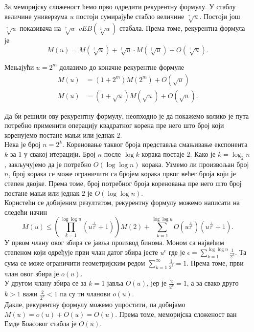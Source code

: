 \documentclass[11pt, a4paper]{article}
\theoremstyle{remark}
\numberwithin{equation}{section}
\begin{document}
	\noindent За меморијску сложеност ћемо прво одредити рекурентну формулу. У стаблу величине универзума $u$ постоји сумирајуће стабло величине $\sqrt[\uparrow]{u}$. Постоји још $\sqrt[\uparrow]{u}$ показивача на $\sqrt[\uparrow]{u}$ $vEB(\sqrt[\downarrow]{u})$ стабала. Према томе, рекурентна формула је
	\begin{equation}
		M(u)=M(\sqrt[\uparrow]{u})+\sqrt[\uparrow]{u}\cdot M(\sqrt[\downarrow]{u})+O(\sqrt[\uparrow]{u}).
	\end{equation}
	
	Мењајући $u=2^m$ долазимо до коначне рекурентне формуле
	\begin{equation}
	\begin{split}
		M(u) &= (1+2^m)M(2^m)+O(\sqrt{u}) \\
		M(u) &= (1+\sqrt{u})M(\sqrt u)+O(\sqrt{u}).
	\end{split}
	\end{equation}
	
	Да би решили ову рекурентну формулу, неопходно је да покажемо колико је пута потребно применити операцију квадратног корена пре него што број који коренујемо постане мањи или једнак $2$. \\
	\indent Нека је број $n=2^k$. Кореновање таквог броја представља смањивање експонента $k$ за $1$ у свакој итерацији. Број $n$ после $\log k$ корака постаје $2$. Како је $k=\log_2 n$, закључујемо да је потребно $O(\log\log n)$ корака. Узмемо ли произвољан број $n$, број корака се може ограничити са бројем корака првог већег броја који је степен двојке. Према томе, број потребног броја кореновања пре него што број постане мањи или једнак $2$ је $O(\log\log n)$. \\
	\indent Користећи се добијеним резултатом, рекурентну формулу можемо написати на следећи начин 
	\begin{equation}
		M(u)\leq \left(\prod_{k=1}^{\log\log u}\left(u^{\frac{1}{2^k}}+1\right)\right)M(2)+\sum_{k=1}^{\log\log u}O\left(u^{\frac{1}{2^k}}\right)\left(u^{\frac{1}{2^k}}+1\right).
	\end{equation}
	\indent У првом члану овог збира се јавља производ бинома. Моном са највећим степеном који одређује први члан датог збира јесте $u^\epsilon$ где је $\epsilon=\sum_{k=1}^{\log\log n}\frac{1}{2^k}$. Та сума се може ограничити геометријским редом $\sum_{k=1}^{\infty}\frac{1}{2^k}=1$. Према томе, први члан овог збира је $o(u)$. \\
	\indent У другом члану збира се за $k=1$ јавља $O(u)$, јер је $\frac{2}{2^k}=1$, а за свако друго $k>1$ важи $\frac{2}{2^k}<1$ па су ти чланови $o(u)$. \\
	\indent Дакле, рекурентну формулу можемо упростити, па добијамо $M(u)=o(u)+O(u)=O(u)$. Према томе, меморијска сложеност ван Емде Боасовог стабла је $O(u)$.
	
\end{document}
